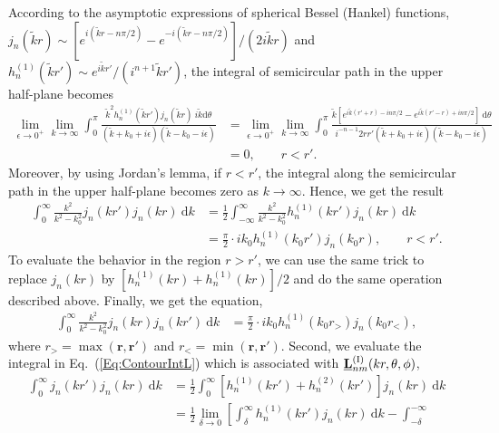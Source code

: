 \documentclass[journal=jacsat,manuscript=article,layout=traditional]{achemso}
\newcommand*\diff{\mathrm{d}}
\newcommand*\br{\mathbf{r}}
\newcommand{\norF}[1]{\underline{\vb{#1}}}
\newcommand{\RomanI}{\scriptsize\textrm{I}}
\begin{document}
\begin{appendix}
\noindent
According to the asymptotic expressions of spherical Bessel (Hankel) functions, $j_n(\tilde{k}r)\sim[e^{i(\tilde{k}r-n\pi/2)}-e^{-i(\tilde{k}r-n\pi/2)}]/(2i\tilde{k}r)$ and $h_n^{(1)}(\tilde{k}r')\sim e^{i\tilde{k}r'}/(i^{n+1}\tilde{k}r')$, the integral of semicircular path in the upper half-plane becomes
\begin{align}
    \nonumber
    \lim_{\epsilon\rightarrow0^+}\lim_{k\rightarrow\infty}\int_0^\pi \frac{\tilde{k}^2h_n^{(1)}(\tilde{k}r')
    j_n(\tilde{k}r)~i\tilde{k}\diff{\theta}}
    {(\tilde{k}+k_0+i\epsilon)(\tilde{k}-k_0-i\epsilon)}
    &=\lim_{\epsilon\rightarrow0^+}
    \lim_{k\rightarrow\infty}\int_0^\pi \frac{
    \tilde{k}\left[e^{i\tilde{k}(r'+r)-in\pi/2}-e^{i\tilde{k}(r'-r)+in\pi/2}\right]
    ~\diff{\theta}}
    {i^{-n-1}2rr'(\tilde{k}+k_0+i\epsilon)(\tilde{k}-k_0-i\epsilon)}\\
    &=0,\qquad r<r'.
\end{align}
Moreover, by using Jordan's lemma, if $r<r'$, the integral along the semicircular path in the upper half-plane becomes zero as $k\rightarrow\infty$.
Hence, we get the result
\begin{align}
    \nonumber
    \int_0^\infty \frac{k^2}{k^2-k_0^2}
    j_n(kr')j_n(kr)~\diff{k}
    &=
    \frac{1}{2}\int_{-\infty}^\infty \frac{k^2}{k^2-k_0^2}
    h_n^{(1)}(kr')j_n(kr)~\diff{k}\\
    &=
    \frac{\pi}{2}\cdot ik_0h_n^{(1)}(k_0r')j_n(k_0r),
    \qquad r<r'.
\end{align}
To evaluate the behavior in the region $r>r'$, we can use the same trick to replace $j_n(kr)$ by $[h_n^{(1)}(kr)+h_n^{(1)}(kr)]/2$ and do the same operation described above.
Finally, we get the equation,
\begin{align}
    \int_0^\infty \frac{k^2}{k^2-k_0^2}
    j_n(kr)j_n(kr')~\diff{k}
    &=
    \frac{\pi}{2}\cdot ik_0h_n^{(1)}(k_0r_>)j_n(k_0r_<),
\end{align}
where $r_>=\max(\br,\br')$ and $r_<=\min(\br,\br')$.
Second, we evaluate the integral in Eq.~(\ref{Eq:ContourIntL}) which is associated with $\norF{L}_{nm}^{(\RomanI)}(kr,\theta,\phi)$,
\begin{align}
    \nonumber
    \int_0^\infty
    j_n(kr')j_n(kr)~ \diff{k}
    &=
    \frac{1}{2}\int_0^\infty 
    \left[h_n^{(1)}(kr')+h_n^{(2)}(kr')\right]
    j_n(kr)
    ~\diff{k}\\
    \nonumber
    &=
    \frac{1}{2}\lim_{\delta\rightarrow0}\left[
    \int_\delta^\infty 
    h_n^{(1)}(kr')j_n(kr)
    ~\diff{k}-
    \int_{-\delta}^{-\infty} 

\end{align}
\end{appendix}
\end{document}
